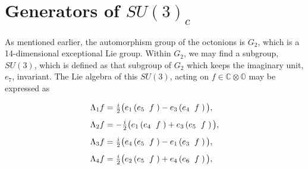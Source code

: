 \documentclass[letterpaper,12pt,titlepage,oneside,final]{book}
\begin{document}
\section{Generators of $SU(3)_c$  }  

As mentioned earlier, the automorphism group of the octonions is $G_2$, which is a 14-dimensional exceptional Lie group.  Within $G_2$, we may find a subgroup, $SU(3)$, which is defined as that subgroup of $G_2$ which keeps the imaginary unit, $e_7$, invariant.  The Lie algebra of this $SU(3)$,  acting on $f\in\mathbb{C}\otimes\mathbb{O}$ may be expressed as

\begin{equation}\begin{array}{l}\label{su3gens}

\Lambda_1f = \frac{i}{2}\big(e_1\left(e_5\hspace{2mm} f\hspace{1mm}\right)-e_3\left(e_4 \hspace{2mm}f\hspace{1mm}\right) \big),  \vspace{3mm} \\



\Lambda_2f = -\frac{i}{2}\big(e_1\left(e_4\hspace{2mm} f\hspace{1mm}\right)+e_3\left(e_5 \hspace{2mm}f\hspace{1mm}\right) \big),  \vspace{3mm} \\





\Lambda_3f = \frac{i}{2}\big(e_4\left(e_5\hspace{2mm} f\hspace{1mm}\right)-e_1\left(e_3 \hspace{2mm}f\hspace{1mm}\right) \big) , \vspace{3mm} \\






 \Lambda_4f = \frac{i}{2}\big(e_2\left(e_5\hspace{2mm} f\hspace{1mm}\right)+e_4\left(e_6 \hspace{2mm}f\hspace{1mm}\right) \big),  
 \vspace{3mm} \\



\end{array}
\end{equation}
\end{document}
